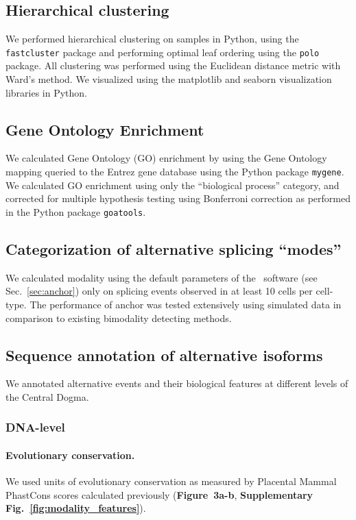 \subsection{Hierarchical clustering}

We performed hierarchical clustering on samples in Python, using the \texttt{fastcluster}\cite{Mullner:2013bl} package and performing optimal leaf ordering\cite{BarJoseph:2001tr} using the \texttt{polo}\cite{Anonymous:2FB4UNR9} package. All clustering was performed using the Euclidean distance metric with Ward's method\cite{WardJr:2012te}. We visualized using the matplotlib\cite{Anonymous:matplotlib} and seaborn\cite{Anonymous:hWlQiCz3} visualization libraries in Python.

\subsection{Gene Ontology Enrichment}
We calculated Gene Ontology (GO) enrichment by using the Gene Ontology mapping queried to the Entrez gene database using the Python package \texttt{mygene}\cite{Wu:2012bo,Xin:2016fv}. We calculated GO enrichment using only the ``biological process'' category, and corrected for multiple hypothesis testing using Bonferroni correction as performed in the Python package \texttt{goatools}\cite{Tang:2015ub}.

\subsection{Categorization of alternative splicing ``modes''}
We calculated modality using the default parameters of the \anchor\, software (see Sec.~\ref{sec:anchor}) only on splicing events observed in at least 10 cells per cell-type. The performance of anchor was tested extensively using simulated data in comparison to existing bimodality detecting methods.

\subsection{Sequence annotation of alternative isoforms}

We annotated alternative events and their biological features at different levels of the Central Dogma.

\subsubsection{DNA-level}

\paragraph{Evolutionary conservation.} We used units of evolutionary conservation as measured by Placental Mammal PhastCons\cite{Siepel:2005cu} scores calculated previously\cite{Lovci:2013cq} (\textbf{Figure~3a-b}, \textbf{Supplementary Fig.~\ref{fig:modality_features}}). 


